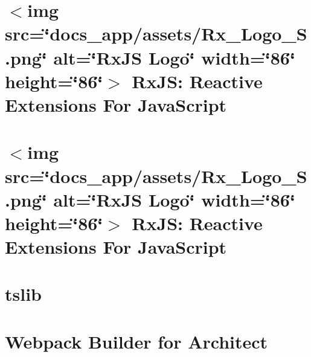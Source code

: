\documentclass[twoside]{book}
\newcommand{\+}{\discretionary{\mbox{\scriptsize$\hookleftarrow$}}{}{}}
\begin{document}
\chapter{\texorpdfstring{$<$}{<}img src=\char`\"{}docs\+\_\+app/assets/\+Rx\+\_\+\+Logo\+\_\+\+S.\+png\char`\"{} alt=\char`\"{}\+Rx\+JS Logo\char`\"{} width=\char`\"{}86\char`\"{} height=\char`\"{}86\char`\"{}\texorpdfstring{$>$}{>} Rx\+JS\+: Reactive Extensions For Java\+Script}
\label{md__c___users_vaishnavi_jadhav__desktop__developer_code_mean_stack_example_client_node_modules__33be9d63b1259aca63a8e686dd8578a6}

\chapter{\texorpdfstring{$<$}{<}img src=\char`\"{}docs\+\_\+app/assets/\+Rx\+\_\+\+Logo\+\_\+\+S.\+png\char`\"{} alt=\char`\"{}\+Rx\+JS Logo\char`\"{} width=\char`\"{}86\char`\"{} height=\char`\"{}86\char`\"{}\texorpdfstring{$>$}{>} Rx\+JS\+: Reactive Extensions For Java\+Script}
\label{md__c___users_vaishnavi_jadhav__desktop__developer_code_mean_stack_example_client_node_modules__9f2010464800addd1efe28cf62799035}

\chapter{tslib}
\label{md__c___users_vaishnavi_jadhav__desktop__developer_code_mean_stack_example_client_node_modules__9ae49feb413a0b768b513f8482356a20}

\chapter{Webpack Builder for Architect}
\label{md__c___users_vaishnavi_jadhav__desktop__developer_code_mean_stack_example_client_node_modules__325a5f9fa667dd1c3e0d95484c92002b}

\end{document}
